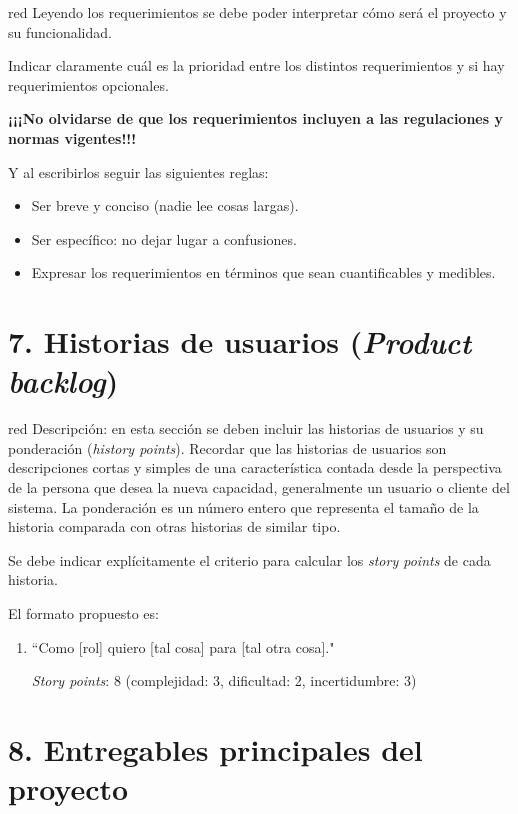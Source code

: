 \documentclass[
11pt, %
]{charter}
\begin{document}
\begin{consigna}{red}
Leyendo los requerimientos se debe poder interpretar cómo será el proyecto y su funcionalidad.

Indicar claramente cuál es la prioridad entre los distintos requerimientos y si hay requerimientos opcionales. 

\textbf{¡¡¡No olvidarse de que los requerimientos incluyen a las regulaciones y normas vigentes!!!}

Y al escribirlos seguir las siguientes reglas:
\begin{itemize}
	\item Ser breve y conciso (nadie lee cosas largas). 
	\item Ser específico: no dejar lugar a confusiones.
	\item Expresar los requerimientos en términos que sean cuantificables y medibles.
\end{itemize}

\end{consigna}

\section{7. Historias de usuarios (\textit{Product backlog})}
\label{sec:backlog}

\begin{consigna}{red}
Descripción: en esta sección se deben incluir las historias de usuarios y su ponderación (\textit{history points}). Recordar que las historias de usuarios son descripciones cortas y simples de una característica contada desde la perspectiva de la persona que desea la nueva capacidad, generalmente un usuario o cliente del sistema. La ponderación es un número entero que representa el tamaño de la historia comparada con otras historias de similar tipo.

Se debe indicar explícitamente el criterio para calcular los \textit{story points} de cada historia.

El formato propuesto es: 
\begin{enumerate}
\item ``Como [rol] quiero [tal cosa] para [tal otra cosa]."

\textit{Story points}: 8 (complejidad: 3, dificultad: 2, incertidumbre: 3)
\end{enumerate}
\end{consigna}

\section{8. Entregables principales del proyecto}
\label{sec:entregables}
\end{document}
